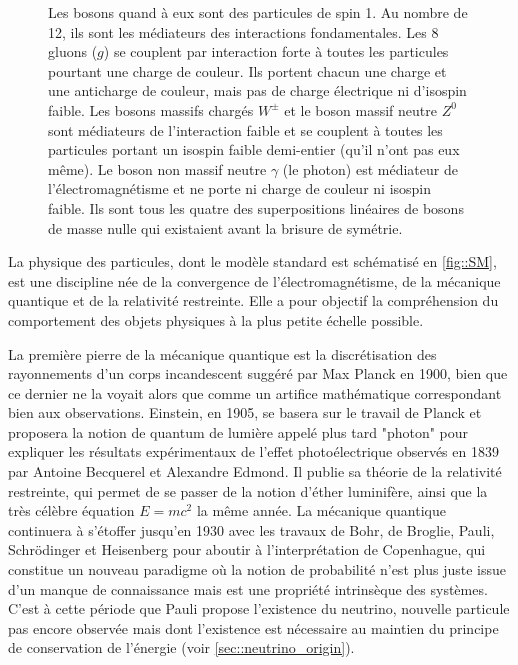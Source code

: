 \begin{figure}
{\begin{normalsize}
		    	Les bosons quand à eux sont des particules de spin 1. Au nombre de 12, ils sont les médiateurs des interactions fondamentales. Les 8 gluons ($g$) se couplent par interaction forte à toutes les particules pourtant une charge de couleur. Ils portent chacun une charge et une anticharge de couleur, mais pas de charge électrique ni d'isospin faible. Les bosons massifs chargés $W^{\pm}$ et le boson massif neutre $Z^0$ sont médiateurs de l'interaction faible et se couplent à toutes les particules portant un isospin faible demi-entier (qu'il n'ont pas eux même). Le boson non massif neutre $\gamma$ (le photon) est médiateur de l'électromagnétisme et ne porte ni charge de couleur ni isospin faible. Ils sont tous les quatre des superpositions linéaires de bosons de masse nulle qui existaient avant la brisure de symétrie.\end{normalsize}}
		    \end{figure}
	    
		    La physique des particules, dont le modèle standard est schématisé en \autoref{fig::SM}, est une discipline née de la convergence de l'électromagnétisme, de la mécanique quantique et de la relativité restreinte. Elle a pour objectif la compréhension du comportement des objets physiques à la plus petite échelle possible.
		    
		    La première pierre de la mécanique quantique est la discrétisation des rayonnements d'un corps incandescent suggéré par Max Planck en 1900\cite{Planck1900}, bien que ce dernier ne la voyait alors que comme un artifice mathématique correspondant bien aux observations. Einstein, en 1905\cite{Einstein1905-quanta}, se basera sur le travail de Planck et proposera la notion de quantum de lumière appelé plus tard "photon" pour expliquer les résultats expérimentaux de l'effet photoélectrique observés en 1839 par Antoine Becquerel et Alexandre Edmond\cite{Becquerel1839}. Il publie sa théorie de la relativité restreinte\cite{Einstein1905-relat}, qui permet de se passer de la notion d'éther luminifère, ainsi que la très célèbre équation $E=mc^2$\cite{Einstein1905-emc2} la même année. La mécanique quantique continuera à s'étoffer jusqu'en 1930 avec les travaux de Bohr, de Broglie, Pauli, Schrödinger et Heisenberg pour aboutir à l'interprétation de Copenhague\cite{Heisenberg1949}, qui constitue un nouveau paradigme où la notion de probabilité n'est plus juste issue d'un manque de connaissance mais est une propriété intrinsèque des systèmes. C'est à cette période que Pauli propose l'existence du neutrino\cite{Pauli1930}, nouvelle particule pas encore observée mais dont l'existence est nécessaire au maintien du principe de conservation de l'énergie (voir \autoref{sec::neutrino_origin}).
		    
